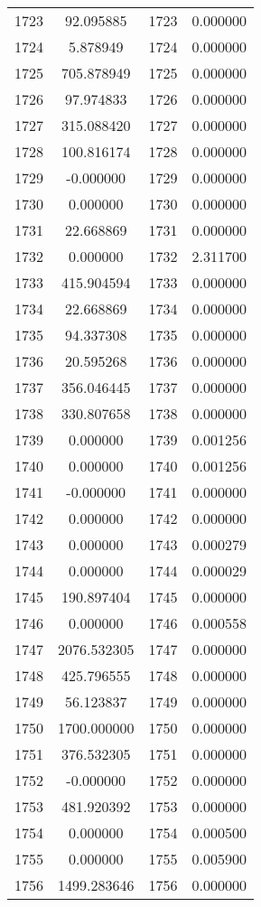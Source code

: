 \documentclass[12pt]{article}
\begin{document}
\begin{longtable}{@{}cccc@{}}
1723 & 92.095885 & 1723 & 0.000000 \\
1724 & 5.878949 & 1724 & 0.000000 \\
1725 & 705.878949 & 1725 & 0.000000 \\
1726 & 97.974833 & 1726 & 0.000000 \\
1727 & 315.088420 & 1727 & 0.000000 \\
1728 & 100.816174 & 1728 & 0.000000 \\
1729 & -0.000000 & 1729 & 0.000000 \\
1730 & 0.000000 & 1730 & 0.000000 \\
1731 & 22.668869 & 1731 & 0.000000 \\
1732 & 0.000000 & 1732 & 2.311700 \\
1733 & 415.904594 & 1733 & 0.000000 \\
1734 & 22.668869 & 1734 & 0.000000 \\
1735 & 94.337308 & 1735 & 0.000000 \\
1736 & 20.595268 & 1736 & 0.000000 \\
1737 & 356.046445 & 1737 & 0.000000 \\
1738 & 330.807658 & 1738 & 0.000000 \\
1739 & 0.000000 & 1739 & 0.001256 \\
1740 & 0.000000 & 1740 & 0.001256 \\
1741 & -0.000000 & 1741 & 0.000000 \\
1742 & 0.000000 & 1742 & 0.000000 \\
1743 & 0.000000 & 1743 & 0.000279 \\
1744 & 0.000000 & 1744 & 0.000029 \\
1745 & 190.897404 & 1745 & 0.000000 \\
1746 & 0.000000 & 1746 & 0.000558 \\
1747 & 2076.532305 & 1747 & 0.000000 \\
1748 & 425.796555 & 1748 & 0.000000 \\
1749 & 56.123837 & 1749 & 0.000000 \\
1750 & 1700.000000 & 1750 & 0.000000 \\
1751 & 376.532305 & 1751 & 0.000000 \\
1752 & -0.000000 & 1752 & 0.000000 \\
1753 & 481.920392 & 1753 & 0.000000 \\
1754 & 0.000000 & 1754 & 0.000500 \\
1755 & 0.000000 & 1755 & 0.005900 \\
1756 & 1499.283646 & 1756 & 0.000000 \\

\end{longtable}
\end{document}
